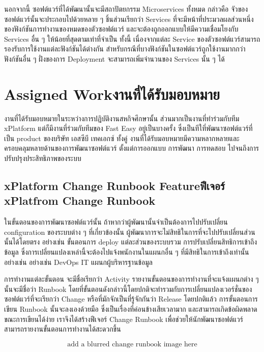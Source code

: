 นอกจากนี้ ซอฟต์แวร์ที่ได้พัฒนานั้นจะมีสถาปัตยกรรม Microservices ทั้งหมด กล่าวคือ จัวของซอฟต์แวร์นั้นจะประกอบไปด้วยหลาย ๆ ชิ้นส่วนเรียกว่า Services ที่จะมีหน้าที่ประมวลผลส่วนหนึ่งของฟังก์ชันการทำงานของหมดของตัวซอฟต์แวร์ และจะต้องถูกออกแบบให้มีความเชื่อมโยงกับ Services อื่น ๆ ให้น้อยที่สุดตามเท่าที่จำเป็น ทั้งนี้ เนื่องจากแต่ละ Service ของตัวซอฟต์แวร์สามารถรองรับการใช้งานแต่ละฟังก์ชันได้ต่างกัน สำหรับกรณีที่บางฟังก์ชันในซอฟต์แวร์ถูกใช้งานมากกว่าฟังก์ชันอื่น ๆ ฝั่งของการ Deployment จะสามารถเพิ่มจำนวนของ Services นั้น ๆ ได้

\section{\ifenglish Assigned Work\else งานที่ได้รับมอบหมาย \fi}
งานที่ได้รับมอบหมายในระหว่างการปฏิบัติงานสหกิจศึกษานั้น ส่วนมากเป็นงานที่ทำร่วมกับทีม xPlatform แต่ก็มีงานที่ร่วมกับทีมของ Fast Easy อยู่เป็นบางครั้ง ซึ่งเป็นทีใที่พัฒนาซอฟต์แวร์ที่เป็น product ของบริษัท เอสซีบี เทคเอกซ์ ทั้งคู่ งานที่ได้รับมอบหมายมีความหลากหลายและครอบคลุมหลายด้านของการพัฒนาซอฟต์แวร์ ตั้งแต่การออกแบบ การพัฒนา การทดสอบ ไปจนถึงการปรับปรุงประสิทธิภาพของระบบ

\subsection{\ifenglish xPlatform Change Runbook​ Feature\else ฟีเจอร์ xPlatfrom Change Runbook\fi}
ในขั้นตอนของการพัฒนาซอฟต์แวร์นั้น ถ้าหากว่าผู้พัฒนานั้นจำเป็นต้องการไปปรับเปลี่ยน configuration ของระบบต่าง ๆ ที่เกี่ยวข้องนั้น ผู้พัฒนาการจะไม่สิทธิในการที่จะไปปรับเปลี่ยนส่วนนั้นได้โดยตรง อย่างเช่น ขั้นตอนการ deploy แต่ละส่วนของระบบรวม การปรับเปลี่ยนสิทธิการเข้าถึงข้อมูล ซึ่งการเปลี่ยนแปลงเหล่านี้จะต้องไปแจ้งพนักงานในแผนกอื่น ๆ ที่มีสิทธิในการเข้าถึงเท่านั้นอย่างเช่น อย่างเช่น DevOps IT แผนกผู้บริหารฐานข้อมูล 

การทำงานแต่ละขั้นตอน จะมีชื่อเรียกว่า Activity รายงานขั้นตอนของการทำงานที่จะแจ้งแผนกต่าง ๆ นั้นจะมีชื่อว่า Runbook โดยที่ขั้นตอนดังกล่าวนี้โดยปกติจะทำรวมกับการเปลี่ยนแปลงเวอร์ชั่นของซอฟต์แวร์ที่จะเรียกว่า Change หรือที่มักจักเป็นที่รู้จักกันว่า Release โดยปกติแล้ว การขั้นตอนการเขียน Runbook นั้นจะลงเองด้วยมือ ซึ่งเป็นเรื่องที่ค่อนข้างเสียเวลามาก และสามารถเกิดข้อผิดพลาดขณะการเขียนได้ง่าย เราจึงได้สร้างฟีเจอร์ Change Runbook เพื่อช่วยให้นักพัฒนาซอฟต์แวร์สามารถรายงานขั้นตอนการทำงานได้สะดวกขึ้น

\[\text{add a blurred change runbook image here}\]

